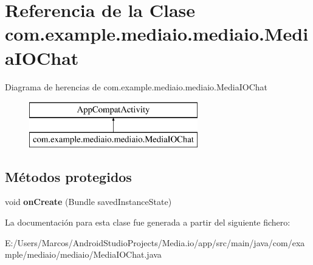 \hypertarget{classcom_1_1example_1_1mediaio_1_1mediaio_1_1_media_i_o_chat}{}\section{Referencia de la Clase com.\+example.\+mediaio.\+mediaio.\+Media\+I\+O\+Chat}
\label{classcom_1_1example_1_1mediaio_1_1mediaio_1_1_media_i_o_chat}
Diagrama de herencias de com.\+example.\+mediaio.\+mediaio.\+Media\+I\+O\+Chat\begin{figure}[H]
\begin{center}
\leavevmode
\includegraphics[height=2.000000cm]{classcom_1_1example_1_1mediaio_1_1mediaio_1_1_media_i_o_chat}
\end{center}
\end{figure}
\subsection*{Métodos protegidos}
\begin{DoxyCompactItemize}
\item 
\mbox{\label{classcom_1_1example_1_1mediaio_1_1mediaio_1_1_media_i_o_chat_a6358cfbf22c5dc7531ed4836a647c879}} 
void {\bfseries on\+Create} (Bundle saved\+Instance\+State)
\end{DoxyCompactItemize}


La documentación para esta clase fue generada a partir del siguiente fichero\+:\begin{DoxyCompactItemize}
\item 
E\+:/\+Users/\+Marcos/\+Android\+Studio\+Projects/\+Media.\+io/app/src/main/java/com/example/mediaio/mediaio/Media\+I\+O\+Chat.\+java\end{DoxyCompactItemize}
